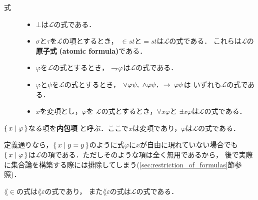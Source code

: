 	\begin{description}
		\item[式] 
			\begin{itemize}
				\item $\bot$は$\mathcal{L}$の式である．
				\item $\sigma$と$\tau$を$\mathcal{L}$の項とするとき，
					$\in st$と$=st$は$\mathcal{L}$の式である．
					これらは$\mathcal{L}$の{\bf 原子式}
					{\bf (atomic formula)}である．
				\item $\varphi$を$\mathcal{L}$の式とするとき，
					$\rightharpoondown\hspace{-0.25em} \varphi$は$\mathcal{L}$の式である．
				\item $\varphi$と$\psi$を$\mathcal{L}$の式とするとき，
					$\vee \varphi \psi,\ \wedge \varphi \psi,\ \rarrow \varphi \psi$は
					いずれも$\mathcal{L}$の式である．
				\item $x$を変項とし，$\varphi$を
					$\mathcal{L}$の式とするとき，$\forall x \varphi$と
					$\exists x \varphi$は$\mathcal{L}$の式である．
			\end{itemize}
	\end{description}
	
	\begin{screen}
		\begin{dfn}[内包項]
			$\{\, x \mid \varphi\, \}$なる項を{\bf 内包項}
			と呼ぶ．ここで$x$は変項であり，$\varphi$は$\mathcal{L}$の式である．
		\end{dfn}
	\end{screen}
	
	定義通りなら，$\{\, x \mid y=y\, \}$のように式$\varphi$に$x$が自由に現れていない場合でも
	$\{\, x \mid \varphi\, \}$は$\mathcal{L}$の項である．ただしそのような項は全く無用であるから，
	後で実際に集合論を構築する際には排除してしまう(\ref{sec:restriction_of_formulas}節参照)．
	
	\begin{screen}
		\begin{metathm}
			$\lang{\in}$の式は$\lang{\varepsilon}$の式であり，
			また$\lang{\varepsilon}$の式は$\mathcal{L}$の式である．
		\end{metathm}
	\end{screen}
	

